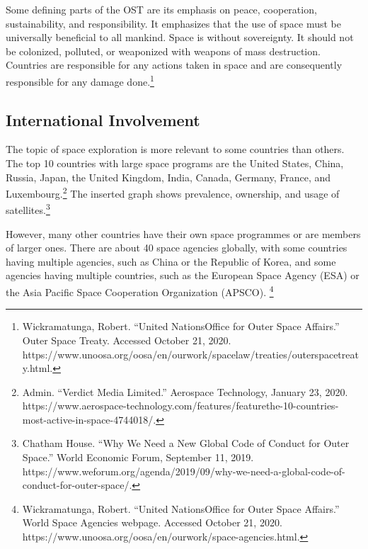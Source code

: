 \documentclass[10pt, letterpaper]{article}
\begin{document}
Some defining parts of the OST are its emphasis on peace, cooperation,
sustainability, and responsibility. It emphasizes that the use of space
must be universally beneficial to all mankind. Space is without
sovereignty. It should not be colonized, polluted, or weaponized with
weapons of mass destruction. Countries are responsible for any actions
taken in space and are consequently responsible for any damage
done.\footnote{Wickramatunga, Robert. ``United NationsOffice for Outer
  Space Affairs.'' Outer Space Treaty. Accessed October 21, 2020.
  https://www.unoosa.org/oosa/en/ourwork/spacelaw/treaties/outerspacetreaty.html.} 

\subsection{International Involvement}

The topic of space exploration is more relevant to some countries than
others. The top 10 countries with large space programs are the United
States, China, Russia, Japan, the United Kingdom, India, Canada,
Germany, France, and Luxembourg.\footnote{Admin. ``Verdict Media
  Limited.'' Aerospace Technology, January 23, 2020.
  https://www.aerospace-technology.com/features/featurethe-10-countries-most-active-in-space-4744018/.}
The inserted graph shows prevalence, ownership, and usage of
satellites.\footnote{Chatham House. ``Why We Need a New Global Code of
  Conduct for Outer Space.'' World Economic Forum, September 11, 2019.
  https://www.weforum.org/agenda/2019/09/why-we-need-a-global-code-of-conduct-for-outer-space/.}

However, many other countries have their own space programmes or are
members of larger ones. There are about 40 space agencies globally, with
some countries having multiple agencies, such as China or the Republic
of Korea, and some agencies having multiple countries, such as the
European Space Agency (ESA) or the Asia Pacific Space Cooperation
Organization (APSCO). \footnote{Wickramatunga, Robert. ``United
  NationsOffice for Outer Space Affairs.'' World Space Agencies webpage.
  Accessed October 21, 2020.
  https://www.unoosa.org/oosa/en/ourwork/space-agencies.html.}\\
  
\end{document}

